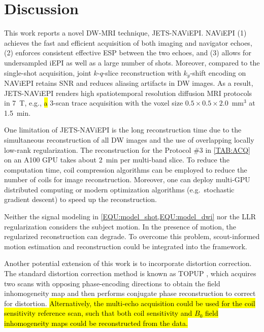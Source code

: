 \documentclass[preprint,12pt,authoryear,review]{elsarticle}
\begin{document}
    \clearpage

    \section{Discussion}
    \label{SEC:Disc}

    This work reports a novel DW-MRI technique, JETS-NAViEPI.
    NAViEPI (1) achieves the fast and efficient acquisition of
    both imaging and navigator echoes,
    (2) enforces consistent effective ESP between the two echoes, and
    (3) allows for undersampled iEPI as well as a large number of shots.
    Moreover, compared to the single-shot acquisition,
    joint $k$-$q$-slice reconstruction
    with $k_y$-shift encoding on NAViEPI
    retains SNR and reduces aliasing artifacts in DW images.
    As a result, JETS-NAViEPI renders high spatiotemporal resolution
    diffusion MRI protocols in \SI{7}{\tesla},
    e.g., \hl{a} 3-scan trace acquisition with the voxel size
    $0.5\times0.5\times2.0$~mm$^3$ at \SI{1.5}{\minute}.

    One limitation of JETS-NAViEPI is the long reconstruction time
    due to the simultaneous reconstruction of all DW images and
    the use of overlapping locally low-rank regularization.
    The reconstruction for the Protocol \#3 in \cref{TAB:ACQ}
    on an A100 GPU takes about \SI{2}{\minute} per multi-band slice.
    To reduce the computation time, coil compression algorithms
    \citep{buehrer_2007_scc,huang_2008_scc}
    can be employed to reduce the number of coils for image reconstruction.
    Moreover, one can deploy multi-GPU distributed computing
    or modern optimization algorithms
    (e.g.~stochastic gradient descent) \citep{ong_2020_extreme}
    to speed up the reconstruction.

    Neither the signal modeling in
    \cref{EQU:model_shot,EQU:model_dwi}
    nor the LLR regularization considers the subject motion.
    In the presence of motion, the regularized reconstruction can degrade.
    To overcome this problem, scout-informed motion estimation
    and reconstruction \citep{polak_2022_samer}
    could be integrated into the framework.

    Another potential extension of this work is
    to incorporate distortion correction.
    The standard distortion correction method is
    known as TOPUP \citep{andersson_2003_topup},
    which acquires two scans
    with opposing phase-encoding directions to
    obtain the field inhomogeneity map and
    then performs conjugate phase reconstruction
    to correct for distortion.
    \hl{Alternatively, the multi-echo acquisition could be used
    for the coil sensitivity reference scan, such that
    both coil sensitivity and $B_0$ field inhomogeneity maps
    could be reconstructed from the data.}
\end{document}
